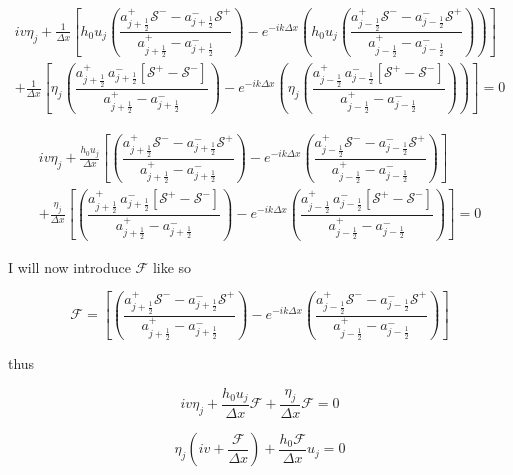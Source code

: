 \documentclass[12pt]{article}
\begin{document}
\begin{multline}
iv\eta_j + \frac{1}{\Delta x} [ h_0u_j \left(\dfrac{a^+_{j+\frac{1}{2}} \mathcal{S^-} - a^-_{j+\frac{1}{2}} \mathcal{S^+} }{a^+_{j+\frac{1}{2}} - a^-_{j+\frac{1}{2}}}\right)  - e^{-ik\Delta x}\left(h_0u_{j} \left(\dfrac{a^+_{j-\frac{1}{2}} \mathcal{S^-} - a^-_{j-\frac{1}{2}} \mathcal{S^+} }{a^+_{j-\frac{1}{2}} - a^-_{j-\frac{1}{2}}}\right) \right)   ] \\
+ \frac{1}{\Delta x} [\eta_{j}  \left(\dfrac{a^+_{j+\frac{1}{2}} \, a^-_{j+\frac{1}{2}}\left [ \mathcal{S^+} -\mathcal{S^-} \right ] }{a^+_{j+\frac{1}{2}} - a^-_{j+\frac{1}{2}}}\right) - e^{-ik\Delta x}\left( \eta_{j} \left(\dfrac{a^+_{j-\frac{1}{2}} \, a^-_{j-\frac{1}{2}}\left [ \mathcal{S^+} -\mathcal{S^-} \right ] }{a^+_{j-\frac{1}{2}} - a^-_{j-\frac{1}{2}}}\right)\right) ] = 0
\end{multline}

\begin{multline}
iv\eta_j + \frac{h_0u_j}{\Delta x} \left[  \left(\dfrac{a^+_{j+\frac{1}{2}} \mathcal{S^-} - a^-_{j+\frac{1}{2}} \mathcal{S^+} }{a^+_{j+\frac{1}{2}} - a^-_{j+\frac{1}{2}}}\right)  - e^{-ik\Delta x} \left(\dfrac{a^+_{j-\frac{1}{2}} \mathcal{S^-} - a^-_{j-\frac{1}{2}} \mathcal{S^+} }{a^+_{j-\frac{1}{2}} - a^-_{j-\frac{1}{2}}}\right)  \right] \\
+ \frac{\eta_{j}}{\Delta x} \left[  \left(\dfrac{a^+_{j+\frac{1}{2}} \, a^-_{j+\frac{1}{2}}\left [ \mathcal{S^+} -\mathcal{S^-} \right ] }{a^+_{j+\frac{1}{2}} - a^-_{j+\frac{1}{2}}}\right) - e^{-ik\Delta x} \left(\dfrac{a^+_{j-\frac{1}{2}} \, a^-_{j-\frac{1}{2}}\left [ \mathcal{S^+} -\mathcal{S^-} \right ] }{a^+_{j-\frac{1}{2}} - a^-_{j-\frac{1}{2}}}\right) \right] = 0
\end{multline}

I will now introduce $\mathcal{F}$ like so

\[\mathcal{F}= \left[  \left(\dfrac{a^+_{j+\frac{1}{2}} \mathcal{S^-} - a^-_{j+\frac{1}{2}} \mathcal{S^+} }{a^+_{j+\frac{1}{2}} - a^-_{j+\frac{1}{2}}}\right)  - e^{-ik\Delta x} \left(\dfrac{a^+_{j-\frac{1}{2}} \mathcal{S^-} - a^-_{j-\frac{1}{2}} \mathcal{S^+} }{a^+_{j-\frac{1}{2}} - a^-_{j-\frac{1}{2}}}\right)  \right]\]

thus

\[
iv\eta_j + \frac{h_0u_j}{\Delta x} \mathcal{F}
+ \frac{\eta_{j}}{\Delta x} \mathcal{F} = 0
\]


\[
\eta_j\left(iv + \frac{\mathcal{F}}{\Delta x}  \right) + \frac{h_0\mathcal{F}}{\Delta x} u_j  = 0
\]
\end{document}
